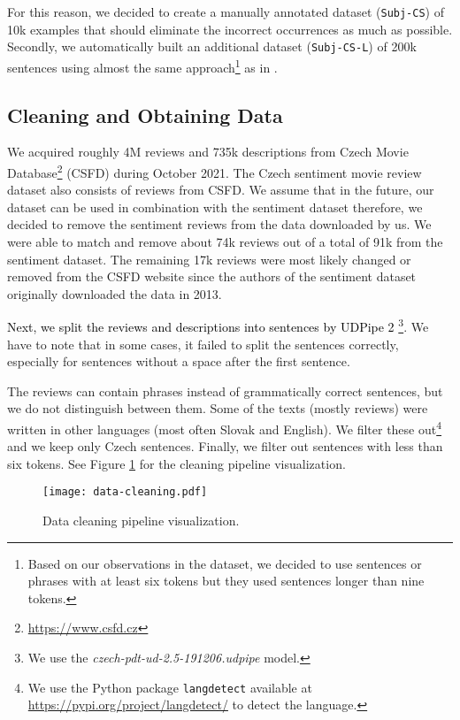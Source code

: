 \documentclass[10pt, a4paper]{article}
\begin{document}
\par For this reason, we decided to create a manually annotated dataset (\texttt{Subj-CS}) of 10k examples that should eliminate the incorrect occurrences as much as possible.
Secondly, we automatically built an additional dataset (\texttt{Subj-CS-L}) of 200k sentences using almost the same approach\footnote{Based on our observations in the dataset, we decided to use sentences or phrases with at least six tokens but they used sentences longer than nine tokens.} as in \cite{english-dataset}.


\subsection{Cleaning and Obtaining Data}
We acquired roughly 4M reviews and 735k descriptions from Czech Movie Database\footnote{\url{https://www.csfd.cz}} (CSFD) during October 2021. The Czech sentiment movie review dataset \cite{habernal-etal-2013-sentiment} also consists of reviews from CSFD. We assume that in the future, our dataset can be used in combination with the sentiment dataset therefore, we decided to remove the sentiment reviews from the data downloaded by us. We were able to match and remove about 74k reviews out of a total of 91k from the sentiment dataset. The remaining 17k reviews were most likely changed or removed from the CSFD website since the authors of the sentiment dataset originally downloaded the data in 2013.

\par\textcolor{black}{Next, we split the reviews and descriptions into sentences by UDPipe 2} \cite{straka-2018-udpipe}\footnote{We use the \textit{czech-pdt-ud-2.5-191206.udpipe}  model.}. We have to note that in some cases, it failed to split the sentences correctly, especially for sentences without a space after the first sentence.




The reviews can contain phrases instead of grammatically correct sentences, but we do not distinguish between them. Some of the texts (mostly reviews) were written in other languages (most often Slovak and English). We filter these out\footnote{We use the Python package \texttt{langdetect} available at \url{https://pypi.org/project/langdetect/} to detect the language.} and we keep only Czech sentences. Finally, we filter out sentences with less than six tokens. See Figure \ref{fig:cleaining-pipeline} for the cleaning pipeline visualization.


\begin{figure}\centering
\texttt{[image: data-cleaning.pdf]}
\caption{Data cleaning pipeline visualization.} 
\label{fig:cleaining-pipeline}
\end{figure}
\end{document}
